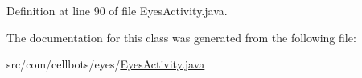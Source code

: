 Definition at line 90 of file Eyes\-Activity.\-java.



The documentation for this class was generated from the following file\-:\begin{DoxyCompactItemize}
\item 
src/com/cellbots/eyes/\hyperlink{_eyes_activity_8java}{Eyes\-Activity.\-java}\end{DoxyCompactItemize}
